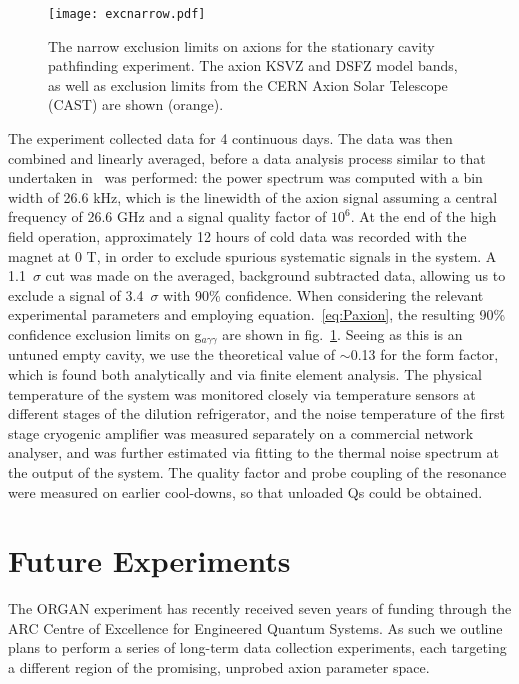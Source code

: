 \documentclass[preprint]{elsarticle}
\begin{document}
\begin{figure}[t]
	\centering
	\texttt{[image: excnarrow.pdf]}
	\caption{The narrow exclusion limits on axions for the stationary cavity pathfinding experiment. The axion KSVZ and DSFZ model bands, as well as exclusion limits from the CERN Axion Solar Telescope (CAST) are shown (orange).}
	\label{fig:narrowlimits}
\end{figure}
The experiment collected data for 4 continuous days. The data was then combined and linearly averaged, before a data analysis process similar to that undertaken in~\cite{Daw:1998jm} was performed: the power spectrum was computed with a bin width of 26.6 kHz, which is the linewidth of the axion signal assuming a central frequency of 26.6 GHz and a signal quality factor of $10^6$. At the end of the high field operation, approximately 12 hours of cold data was recorded with the magnet at 0 T, in order to exclude spurious systematic signals in the system. A 1.1~$\sigma$ cut was made on the averaged, background subtracted data, allowing us to exclude a signal of 3.4~$\sigma$ with 90\% confidence. When considering the relevant experimental parameters and employing equation.~\ref{eq:Paxion}, the resulting 90\% confidence exclusion limits on g$_{a\gamma\gamma}$ are shown in fig.~\ref{fig:narrowlimits}. Seeing as this is an untuned empty cavity, we use the theoretical value of $\sim$0.13 for the form factor, which is found both analytically and via finite element analysis. The physical temperature of the system was monitored closely via temperature sensors at different stages of the dilution refrigerator, and the noise temperature of the first stage cryogenic amplifier was measured separately on a commercial network analyser, and was further estimated via fitting to the thermal noise spectrum at the output of the system. The quality factor and probe coupling of the resonance were measured on earlier cool-downs, so that unloaded Qs could be obtained.
\section{Future Experiments}
The ORGAN experiment has recently received seven years of funding through the ARC Centre of Excellence for Engineered Quantum Systems. As such we outline plans to perform a series of long-term data collection experiments, each targeting a different region of the promising, unprobed axion parameter space. 
\end{document}
